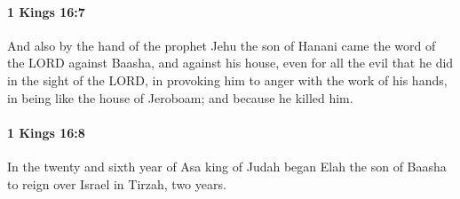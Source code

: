 		\paragraph{1 Kings 16:7} %
			\label{1KINGS-16-7}

			And also by the hand of the prophet Jehu the son of Hanani came the word of the LORD against Baasha, and against his house, even for all the evil that he did in the sight of the LORD, in provoking him to anger with the work of his hands, in being like the house of Jeroboam; and because he killed him.


		\paragraph{1 Kings 16:8} %
			\label{1KINGS-16-8}

			In the twenty and sixth year of Asa king of Judah began Elah the son of Baasha to reign over Israel in Tirzah, two years.


